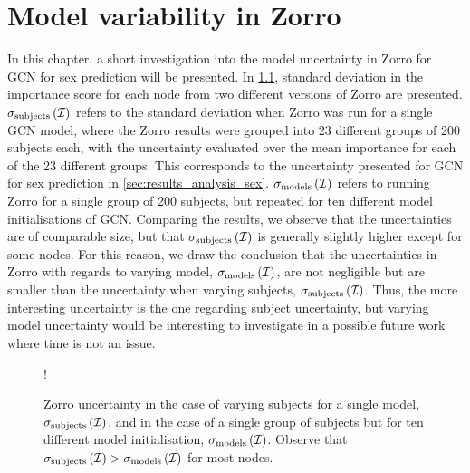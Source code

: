 \chapter{Model variability in Zorro}
\label{app:zorro_model_uncertainty}

In this chapter, a short investigation into the model uncertainty in Zorro for GCN for sex prediction will be presented. In \cref{fig:zorro_model_uncertainty}, standard deviation in the importance score for each node from two different versions of Zorro are presented. $\sigma_{\rm{subjects}}\left(\mathcal{I}\right)$ refers to the standard deviation when Zorro was run for a single GCN model, where the Zorro results were grouped into 23 different groups of 200 subjects each, with the uncertainty evaluated over the mean importance for each of the 23 different groups. This corresponds to the uncertainty presented for GCN for sex prediction in \cref{sec:results_analysis_sex}. $\sigma_{\rm{models}}\left(\mathcal{I}\right)$ refers to running Zorro for a single group of 200 subjects, but repeated for ten different model initialisations of GCN. Comparing the results, we observe that the uncertainties are of comparable size, but that $\sigma_{\rm{subjects}}\left(\mathcal{I}\right)$ is generally slightly higher except for some nodes. For this reason, we draw the conclusion that the uncertainties in Zorro with regards to varying model, $\sigma_{\rm{models}}\left(\mathcal{I}\right)$, are not negligible but are smaller than the uncertainty when varying subjects, $\sigma_{\rm{subjects}}\left(\mathcal{I}\right)$. Thus, the more interesting uncertainty is the one regarding subject uncertainty, but varying model uncertainty would be interesting to investigate in a possible future work where time is not an issue.

\begin{figure}[ht]
    \centering
    \begin{center}
        \resizebox {0.6\linewidth} {!} {
            
        }
    \end{center}
    \caption{Zorro uncertainty in the case of varying subjects for a single model, $\sigma_{\rm{subjects}}\left(\mathcal{I}\right)$, and in the case of a single group of subjects but for ten different model initialisation, $\sigma_{\rm{models}}\left(\mathcal{I}\right)$. Observe that $\sigma_{\rm{subjects}}\left(\mathcal{I}\right) > \sigma_{\rm{models}}\left(\mathcal{I}\right)$ for most nodes.}
    \label{fig:zorro_model_uncertainty}
\end{figure}